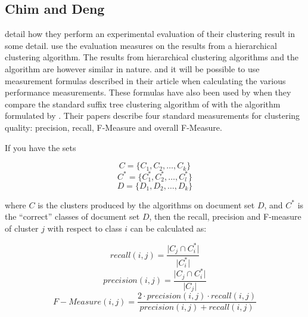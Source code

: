 \subsection{Chim and Deng}

\cite{Chim2007} detail how they perform an experimental evaluation of their clustering result in some detail. \citeauthor{Chim2007} use the evaluation measures on the results from a hierarchical clustering algorithm. The results from hierarchical clustering algorithms and the \CTC algorithm are however similar in nature. and it will be possible to use measurement formulas described in their article when calculating the various performance measurements. These formulas have also been used by \cite{Rafi2011} when they compare the standard suffix tree clustering algorithm of \citeauthor{Oren1998} with the algorithm formulated by \citeauthor{Chim2008}. Their papers describe four standard measurements for clustering quality: precision, recall, F-Measure and overall F-Measure.

If you have the sets

\begin{displaymath}
C = \{C_{1}, C_{2}, \dots, C_{k}\}
\end{displaymath}
\begin{displaymath}
C^* = \{C_1^*, C_2^*, \dots, C_l^*\}
\end{displaymath}
\begin{displaymath}
D = \{D_{1}, D_{2}, \dots, D_{k}\}
\end{displaymath}

where \(C\) is the clusters produced by the algorithms on document set \(D\), and \(C^*\) is the ``correct'' classes of document set \(D\), then the recall, precision and F-measure of cluster \(j\) with respect to class \(i\) can be calculated as:

\begin{displaymath}
recall(i,j) = \frac{\vert C_{j} \cap C_i^* \vert}{\vert C_i^* \vert}
\end{displaymath}
\begin{displaymath}
precision(i,j) = \frac{\vert C_{j} \cap C_i^* \vert}{\vert C_{j} \vert}
\end{displaymath}
\begin{displaymath}
F-Measure(i,j) = \frac{2 \cdot precision(i,j) \cdot recall(i,j)}{precision(i,j) + recall(i,j)}
\end{displaymath}

